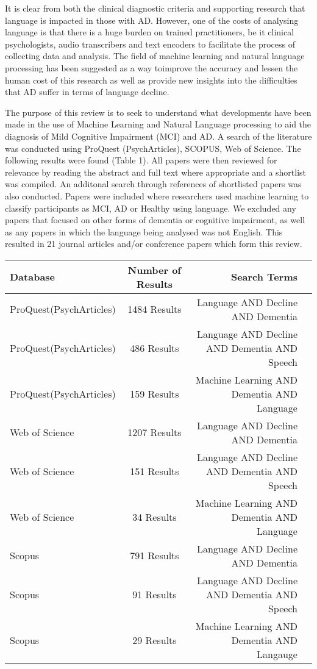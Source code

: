 \documentclass[a4paper]{article}
\begin{document}
\par
It is clear from both the clinical diagnostic criteria and supporting research that language is impacted in those with AD. However, one of the costs of analysing language is that there is a huge burden on trained practitioners, be it clinical psychologists, audio transcribers and text encoders to facilitate the process of collecting data and analysis. The field of machine learning and natural language processing has been suggested as a way toimprove the accuracy and lessen the human cost of this research as well as provide new insights into the difficulties that AD suffer in terms of language decline. \newline
\par  
The purpose of this review is to seek to understand what developments have been made in the use of Machine Learning and Natural Language processing to aid the diagnosis of Mild Cognitive Impairment (MCI) and AD. A search of the literature was conducted using ProQuest (PsychArticles), SCOPUS, Web of Science. The following results were found (Table 1). All papers were then reviewed for relevance by reading the abstract and full text where appropriate and a shortlist was compiled. An additonal search through references of shortlisted papers was also conducted. Papers were included where researchers used machine learning to classify participants as MCI, AD or Healthy using language. We excluded any papers that focused on other forms of dementia or cognitive impairment, as well as any papers in which the language being analysed was not English. This resulted in 21 journal articles and/or conference papers which form this review.

\begin{center}
	\begin{tabular}{ | l | c | r | p{1cm} |}
		\hline
		Database & Number of Results & Search Terms  \\ \hline
		ProQuest(PsychArticles) & 1484 Results & Language AND Decline AND Dementia \\ \hline
		ProQuest(PsychArticles) & 486 Results  & Language AND Decline AND Dementia AND Speech \\ \hline
		ProQuest(PsychArticles) & 159 Results & Machine Learning AND Dementia AND Language \\ \hline
		Web of Science & 1207 Results  & Language AND Decline AND Dementia   \\ \hline
		Web of Science & 151 Results  & Language AND Decline AND Dementia AND Speech  \\ \hline
		Web of Science & 34 Results & Machine Learning AND Dementia AND Language \\ \hline
		Scopus & 791 Results & Language AND Decline AND Dementia  \\ \hline
		Scopus & 91 Results & Language AND Decline AND Dementia AND Speech   \\ \hline
		Scopus & 29 Results & Machine Learning AND Dementia AND Langauge \\ \hline
	\end{tabular}
\end{center}
\end{document}
